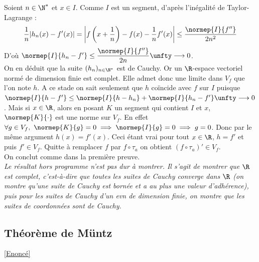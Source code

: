 \documentclass{book}
\begin{document}
	Soient $n\in \N^*$ et $x\in I$. Comme $I$ est un segment, d'après l'inégalité de Taylor-Lagrange :
	$$\frac{1}{n}|h_n(x)-f'(x)|=\left|f\left(x+\frac{1}{n}\right)-f(x)-\frac{1}{n}f'(x)\right|\leq \frac{\normep{I}{f''}}{2n^2}$$
	D'où $\normep{I}{h_n-f'}\leq \dfrac{\normep{I}{f''}}{2n}\unfty\longrightarrow 0$.\\
	On en déduit que la suite $(h_n)_{n\in \N^*}$ est de Cauchy. Or un $\R$-espace vectoriel normé de dimension finie est complet. Elle admet donc une limite dans $V_f$ que l'on note $h$. A ce stade on sait seulement que $h$ coïncide avec $f$ sur $I$ puisque $\normep{I}{h-f'}\leq \normep{I}{h-h_n}+\normep{I}{h_n-f'}\unfty\longrightarrow 0$. Mais si $x\in \R$, alors en posant $K$ un segment qui contient $I$ et $x$, $\normep{K}{\cdot}$ est une norme sur $V_f$. En effet $\forall g\in V_f,\ \normep{K}{g}=0\implies \normep{I}{g}=0\implies g=0$. Donc par le même argument $h(x)=f'(x)$. Ceci étant vrai pour tout $x\in \R$, $h=f'$ et puis $f'\in V_f$. Quitte à remplacer $f$ par $f\circ \tau_a$ on obtient $(f\circ \tau_a)'\in V_f$.\\
	On conclut comme dans la première preuve.\\
	\textit{Le résultat hors programme n'est pas dur à montrer. Il s'agit de montrer que $\R$ est complet, c'est-à-dire que toutes les suites de Cauchy converge dans $\R$ (on montre qu'une suite de Cauchy est bornée et a au plus une valeur d'adhérence), puis pour les suites de Cauchy d'un evn de dimension finie, on montre que les suites de coordonnées sont de Cauchy.}
	
	\subsection{Théorème de Müntz}
	\label{sec:theoreme-de-muntz}
	\textcolor{blue}{\hyperref[Théorème de Muntz]{[Enoncé]}}\\
	
	
	
	
\end{document}
